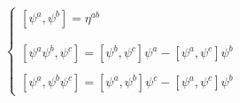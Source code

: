 \begin{equation}
\left\{ 
\begin{array}{c}
\left[ \psi ^{a},\psi ^{b}\right] =\eta ^{ab} \\ 
\\ 
\\ 
\left[ \psi ^{a}\psi ^{b},\psi ^{c}\right] =\left[ \psi ^{b},\psi
^{c}\right] \psi ^{a}-\left[ \psi ^{a},\psi ^{c}\right] \psi ^{b} \\ 
\\ 
\left[ \psi ^{a},\psi ^{b}\psi ^{c}\right] =\left[ \psi ^{a},\psi
^{b}\right] \psi ^{c}-\left[ \psi ^{a},\psi ^{c}\right] \psi ^{b}
\end{array}
\right.
\end{equation}

